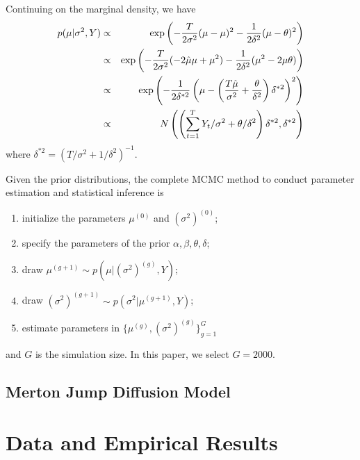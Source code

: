 \documentclass[11pt,reqno,final]{amsart}
\def\exp{\hbox{\rm exp}}
\begin{document}
Continuing on the marginal density, we have
\begin{eqnarray*}
p(\mu|\sigma^2, Y) &\propto& \exp\left(-\frac{T}{2\sigma^2}(\mu-\mu)^2-\frac{1}{2\delta^2}(\mu-\theta)^2\right) \\
                   &\propto& \exp\left(-\frac{T}{2\sigma^2}(-2\hat{\mu}\mu+\mu^2)-\frac{1}{2\delta^2}(\mu^2-2\mu\theta)\right) \\
                   &\propto& \exp\left(-\frac{1}{2\delta^{*2}} \left( \mu-\left(\frac{T\hat{\mu}}{\sigma^2} + \frac{\theta}{\delta^2}\right)\delta^{*2} \right)^2 \right) \\
                   &\propto& N\left( \left( \sum_{t=1}^T Y_t / \sigma^2 + \theta/\delta^2 \right)\delta^{*2}, \delta^{*2} \right)
\end{eqnarray*}
where $\delta^{*2} = (T/\sigma^2+1/\delta^2)^{-1}$.

Given the prior distributions, the complete MCMC method to conduct parameter estimation and statistical inference is
\begin{enumerate}
    \item initialize the parameters $\mu^{(0)}$ and $(\sigma^2)^{(0)}$;
    \item specify the parameters of the prior $\alpha, \beta, \theta, \delta$;
    \item draw $\mu^{(g+1)} \sim p(\mu|(\sigma^2)^{(g)}, Y)$;
    \item draw $(\sigma^2)^{(g+1)} \sim p(\sigma^2|\mu^{(g+1)}, Y)$;
    \item estimate parameters in $\{\mu^{(g)}, (\sigma^2)^{(g)} \}_{g=1}^{G}$
\end{enumerate}
and $G$ is the simulation size. In this paper, we select $G=2000$.

\subsection{Merton Jump Diffusion Model}

\section{Data and Empirical Results}
\end{document}
